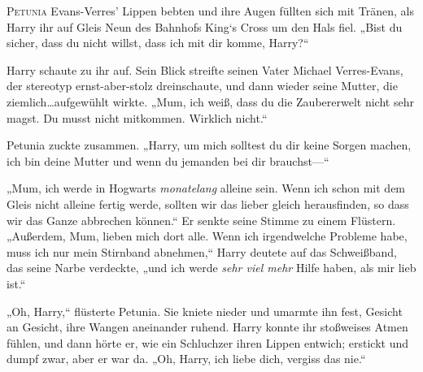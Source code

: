 \lettrine{P}{etunia} Evans-Verres’ Lippen bebten und ihre Augen füllten sich mit Tränen, als Harry ihr auf Gleis Neun des Bahnhofs King‘s Cross um den Hals fiel. „Bist du sicher, dass du nicht willst, dass ich mit dir komme, Harry?“

Harry schaute zu ihr auf. Sein Blick streifte seinen Vater Michael Verres-Evans, der stereotyp ernst-aber-stolz dreinschaute, und dann wieder seine Mutter, die ziemlich…aufgewühlt wirkte. „Mum, ich weiß, dass du die Zaubererwelt nicht sehr magst. Du musst nicht mitkommen. Wirklich nicht.“

Petunia zuckte zusammen. „Harry, um mich solltest du dir keine Sorgen machen, ich bin deine Mutter und wenn du jemanden bei dir brauchst—“

„Mum, ich werde in Hogwarts \emph{monatelang} alleine sein. Wenn ich schon mit dem Gleis nicht alleine fertig werde, sollten wir das lieber gleich herausfinden, so dass wir das Ganze abbrechen können.“ Er senkte seine Stimme zu einem Flüstern. „Außerdem, Mum, lieben mich dort alle. Wenn ich irgendwelche Probleme habe, muss ich nur mein Stirnband abnehmen,“ Harry deutete auf das Schweißband, das seine Narbe verdeckte, „und ich werde \emph{sehr viel mehr} Hilfe haben, als mir lieb ist.“

„Oh, Harry,“ flüsterte Petunia. Sie kniete nieder und umarmte ihn fest, Gesicht an Gesicht, ihre Wangen aneinander ruhend. Harry konnte ihr stoßweises Atmen fühlen, und dann hörte er, wie ein Schluchzer ihren Lippen entwich; erstickt und dumpf zwar, aber er war da. „Oh, Harry, ich liebe dich, vergiss das nie.“

